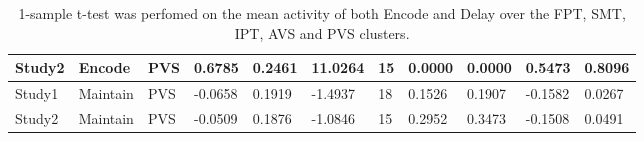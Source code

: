 \begin{table}
\begin{tabular}[0.2em]{@{}lllllllllll@{}}
Study2 & Encode & PVS & 0.6785 & 0.2461 & 11.0264 & 15 & 0.0000 & 0.0000 & 0.5473 & 0.8096 \\\midrule
Study1 & Maintain & PVS & -0.0658 & 0.1919 & -1.4937 & 18 & 0.1526 & 0.1907 & -0.1582 & 0.0267 \\\midrule
Study2 & Maintain & PVS & -0.0509 & 0.1876 & -1.0846 & 15 & 0.2952 & 0.3473 & -0.1508 & 0.0491 \\\bottomrule[0.2em]
\end{tabular}
\caption{1-sample t-test was perfomed on the mean activity of both Encode and Delay over the FPT, SMT, IPT, AVS and PVS clusters.\label{tabel:GEMvsRestBA}}
\end{table}
